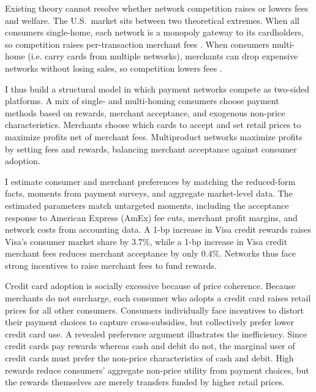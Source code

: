 \documentclass[main.tex]{subfiles}
\begin{document}
Existing theory cannot resolve whether network competition raises or lowers fees and welfare.
The U.S.\ market sits between two theoretical extremes.
When all consumers single-home, each network is a monopoly gateway to its cardholders, so competition raises per-transaction merchant fees \parencite{Armstrong2006, Edelman.Wright2015}. 
When consumers multi-home (i.e. carry cards from multiple networks), merchants can drop expensive networks without losing sales, so competition lowers fees \parencite{Anderson.etal2018, Bakos.Halaburda2020, Teh.etal2022}.

I thus build a structural model in which payment networks compete as two-sided platforms.
A mix of single- and multi-homing consumers choose payment methods based on rewards, merchant acceptance, and exogenous non-price characteristics.
Merchants choose which cards to accept and set retail prices to maximize profits net of merchant fees.
Multiproduct networks maximize profits by setting fees and rewards, balancing merchant acceptance against consumer adoption.

I estimate consumer and merchant preferences by matching the reduced-form facts, moments from payment surveys, and aggregate market-level data.
The estimated parameters match untargeted moments, including the acceptance response to American Express (AmEx) fee cuts, merchant profit margins, and network costs from accounting data.
A 1-bp increase in Visa credit rewards raises Visa's consumer market share by $3.7\%$, while a 1-bp increase in Visa credit merchant fees reduces merchant acceptance by only $0.4\%$.
Networks thus face strong incentives to raise merchant fees to fund rewards.

Credit card adoption is socially excessive because of price coherence.
Because merchants do not surcharge, each consumer who adopts a credit card raises retail prices for all other consumers.
Consumers individually face incentives to distort their payment choices to capture cross-subsidies, but collectively prefer lower credit card use.
A revealed preference argument illustrates the inefficiency.
Since credit cards pay rewards whereas cash and debit do not, the marginal user of credit cards must prefer the non-price characteristics of cash and debit.
High rewards reduce consumers' aggregate non-price utility from payment choices, but the rewards themselves are merely transfers funded by higher retail prices.
\end{document}
